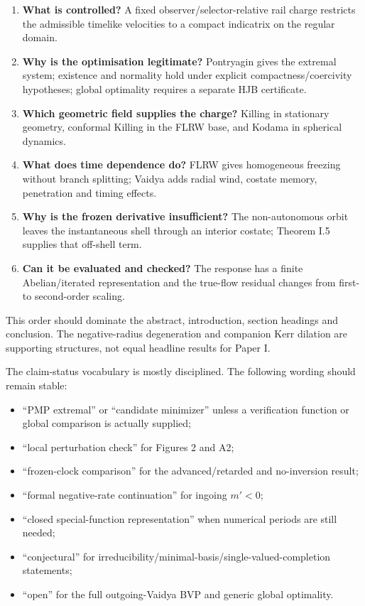 \documentclass[11pt,a4paper]{article}
\begin{document}
\begin{enumerate}
  \item \textbf{What is controlled?} A fixed observer/selector-relative rail charge restricts
  the admissible timelike velocities to a compact indicatrix on the regular domain.
  \item \textbf{Why is the optimisation legitimate?} Pontryagin gives the extremal system;
  existence and normality hold under explicit compactness/coercivity hypotheses; global
  optimality requires a separate HJB certificate.
  \item \textbf{Which geometric field supplies the charge?} Killing in stationary geometry,
  conformal Killing in the FLRW base, and Kodama in spherical dynamics.
  \item \textbf{What does time dependence do?} FLRW gives homogeneous freezing without branch
  splitting; Vaidya adds radial wind, costate memory, penetration and timing effects.
  \item \textbf{Why is the frozen derivative insufficient?} The non-autonomous orbit leaves the
  instantaneous shell through an interior costate; Theorem I.5 supplies that off-shell term.
  \item \textbf{Can it be evaluated and checked?} The response has a finite Abelian/iterated
  representation and the true-flow residual changes from first- to second-order scaling.
\end{enumerate}

This order should dominate the abstract, introduction, section headings and conclusion. The
negative-radius degeneration and companion Kerr dilation are supporting structures, not equal
headline results for Paper I.

The claim-status vocabulary is mostly disciplined. The following wording should remain stable:
\begin{itemize}
  \item ``PMP extremal'' or ``candidate minimizer'' unless a verification function or global
  comparison is actually supplied;
  \item ``local perturbation check'' for Figures 2 and A2;
  \item ``frozen-clock comparison'' for the advanced/retarded and no-inversion result;
  \item ``formal negative-rate continuation'' for ingoing $m'<0$;
  \item ``closed special-function representation'' when numerical periods are still needed;
  \item ``conjectural'' for irreducibility/minimal-basis/single-valued-completion statements;
  \item ``open'' for the full outgoing-Vaidya BVP and generic global optimality.
\end{itemize}
\end{document}
